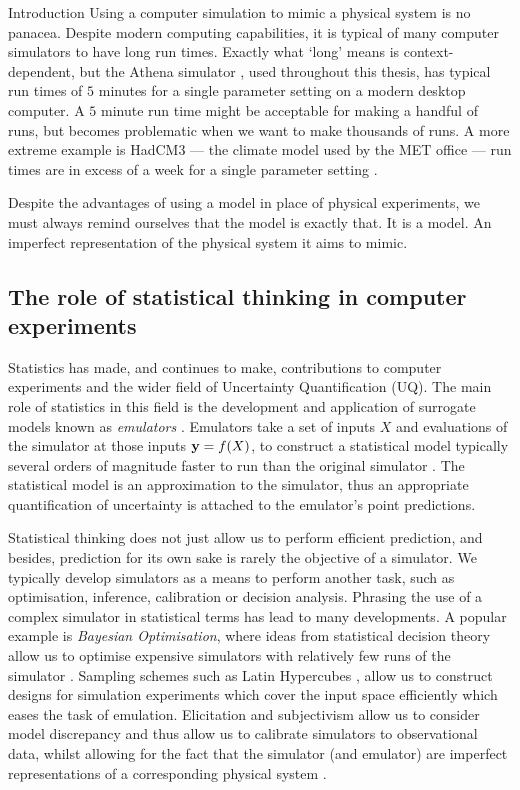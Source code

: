 \begin{chapter}{Introduction \label{Ch:Intro}}
Using a computer simulation to mimic a physical system is no panacea. Despite modern computing capabilities, it is typical of many computer simulators to have long run times. Exactly what `long' means is context-dependent, but the Athena simulator \citep{Zit13, Zit16, Zit2021}, used throughout this thesis, has typical run times of $5$ minutes for a single parameter setting on a modern desktop computer. A $5$ minute run time might be acceptable for making a handful of runs, but becomes problematic when we want to make thousands of runs. A more extreme example is HadCM3 --- the climate model used by the MET office --- run times are in excess of a week for a single parameter setting \citep{Domingo2020}.

Despite the advantages of using a model in place of physical experiments, we must always remind ourselves that the model is exactly that. It is a model. An imperfect representation of the physical system it aims to mimic.

\subsection{The role of statistical thinking in computer experiments}

Statistics has made, and continues to make, contributions to computer experiments and the wider field of Uncertainty Quantification (UQ). The main role of statistics in this field is the development and application of surrogate models known as \textit{emulators} \citep{Ohagan01, Vernon14}. Emulators take a set of inputs $X$ and evaluations of the simulator at those inputs $\mathbf{y} = f(X)$, to construct a statistical model typically several orders of magnitude faster to run than the original simulator \citep{Salter2016}. The statistical model is an approximation to the simulator, thus an appropriate quantification of uncertainty is attached to the emulator's point predictions.

Statistical thinking does not just allow us to perform efficient prediction, and besides, prediction for its own sake is rarely the objective of a simulator. We typically develop simulators as a means to perform another task, such as optimisation, inference, calibration or decision analysis. Phrasing the use of a complex simulator in statistical terms has lead to many developments. A popular example is \textit{Bayesian Optimisation}, where ideas from statistical decision theory allow us to optimise expensive simulators with relatively few runs of the simulator \citep{Frazier2018}. Sampling schemes such as Latin Hypercubes \citep{Mckay1979}, allow us to construct designs for simulation experiments which cover the input space efficiently which eases the task of emulation. Elicitation and subjectivism allow us to consider model discrepancy and thus allow us to calibrate simulators to observational data, whilst allowing for the fact that the simulator (and emulator) are imperfect representations of a corresponding physical system \citep{Ohagan01, Vernon2022}.


\end{chapter}
